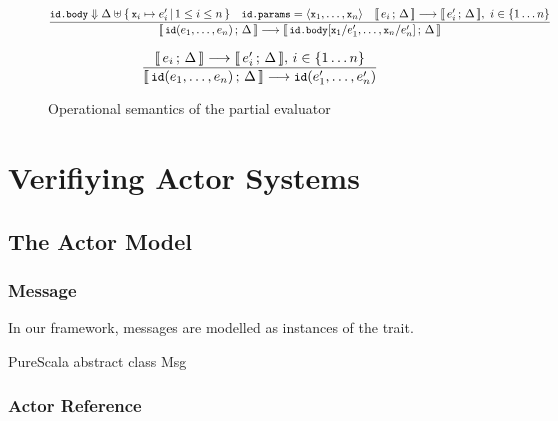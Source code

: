 \begin{figure}[htb]
\begin{framed}
\begin{equation}
\dfrac{
 \texttt{\small{id.body}} \Downarrow \Delta \uplus \{\,\texttt{\small{x}}_i \mapsto e_i'\,|\, 1 \leq i \leq n\,\}
 \quad
 \texttt{\small{id.params}} = \langle \texttt{\small{x}}_1, \ldots, \texttt{\small{x}}_n \rangle
 \quad
 \llbracket\, e_i\,;\, \Delta\, \rrbracket \longrightarrow \llbracket\, e_i'\,;\, \Delta\, \rrbracket,\  i \in \{1 \ldots n\}
}{
  \llbracket\, \texttt{\small{id}}(e_1,\ldots,e_n)\,;\, \Delta\, \rrbracket \longrightarrow
  \llbracket\, \texttt{\small{id.body}}[\texttt{\small{x}}_1/e_1',\ldots,\texttt{\small{x}}_n/e_n']\,;\, \Delta\, \rrbracket
}
\end{equation}

\begin{equation}
\dfrac{
 \llbracket\, e_i\,;\, \Delta\, \rrbracket \longrightarrow \llbracket\, e_i'\,;\, \Delta\, \rrbracket,\, i \in \{1 \ldots n\}
}{
  \llbracket\, \texttt{\small{id}}(e_1,\ldots,e_n)\,;\, \Delta\, \rrbracket \longrightarrow
  \texttt{\small{id}}(e_1',\ldots,e_n')
}
\end{equation}

\end{framed}
\vspace{-10pt}
\caption{Operational semantics of the partial evaluator \label{fig:partialsem}}
\end{figure}


\clearpage
\section{Verifiying Actor Systems}
\label{actors}

\subsection{The Actor Model}


\cite{actario} \cite{verdi} \cite{akka}

\subsubsection*{Message}

In our framework, messages are modelled as instances of the  trait.

\begin{ShortCode}{PureScala}
abstract class Msg
\end{ShortCode}

\subsubsection*{Actor Reference}

